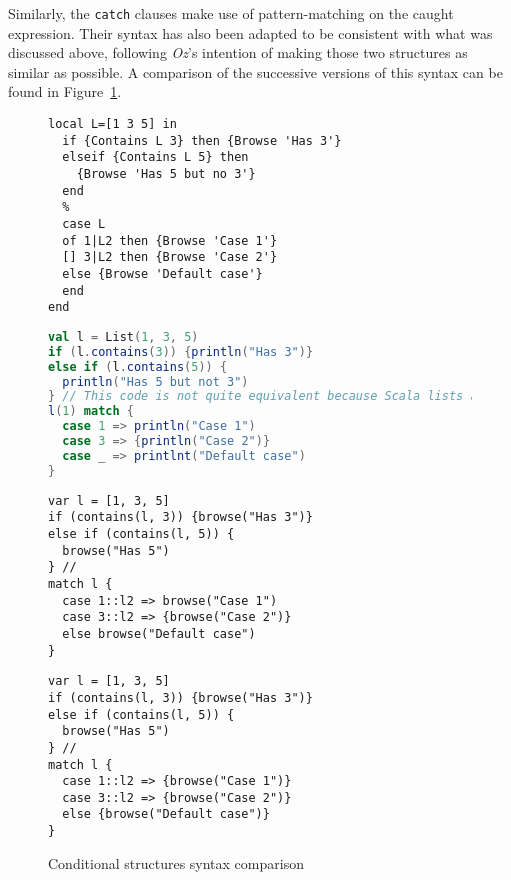 Similarly, the \texttt{catch} clauses make use of pattern-matching on the caught expression.
Their syntax has also been adapted to be consistent with what was discussed above, following \textit{Oz}'s intention of making those two structures as similar as possible.
A comparison of the successive versions of this syntax can be found in Figure~\ref{fig:code-comp-cond}.
\begin{figure}
    \noindent\begin{minipage}{.49\textwidth}
\begin{lstlisting}[title={Oz},language=oz]
local L=[1 3 5] in
  if {Contains L 3} then {Browse 'Has 3'}
  elseif {Contains L 5} then
    {Browse 'Has 5 but no 3'}
  end
  %
  case L
  of 1|L2 then {Browse 'Case 1'}
  [] 3|L2 then {Browse 'Case 2'}
  else {Browse 'Default case'}
  end
end
\end{lstlisting}
    \end{minipage}
    \hfill
    \noindent\begin{minipage}{.49\textwidth}
\begin{lstlisting}[title={Scala/Ozma},language=scala]
val l = List(1, 3, 5)
if (l.contains(3)) {println("Has 3")}
else if (l.contains(5)) {
  println("Has 5 but not 3")
} // This code is not quite equivalent because Scala lists aren't recursive structures :
l(1) match {
  case 1 => println("Case 1")
  case 3 => {println("Case 2")}
  case _ => printlnt("Default case")
}
\end{lstlisting}
    \end{minipage}
    \noindent\begin{minipage}{.49\textwidth}
\begin{lstlisting}[title={NewOz 2020},language=newoz]
var l = [1, 3, 5]
if (contains(l, 3)) {browse("Has 3")}
else if (contains(l, 5)) {
  browse("Has 5")
} //
match l {
  case 1::l2 => browse("Case 1")
  case 3::l2 => {browse("Case 2")}
  else browse("Default case")
}
\end{lstlisting}
    \end{minipage}
    \hfill
    \noindent\begin{minipage}{.49\textwidth}
\begin{lstlisting}[title={NewOz 2021},language=newoz]
var l = [1, 3, 5]
if (contains(l, 3)) {browse("Has 3")}
else if (contains(l, 5)) {
  browse("Has 5")
} //
match l {
  case 1::l2 => {browse("Case 1")}
  case 3::l2 => {browse("Case 2")}
  else {browse("Default case")}
}
\end{lstlisting}
    \end{minipage}
\caption{Conditional structures syntax comparison}
\label{fig:code-comp-cond}
\end{figure}

